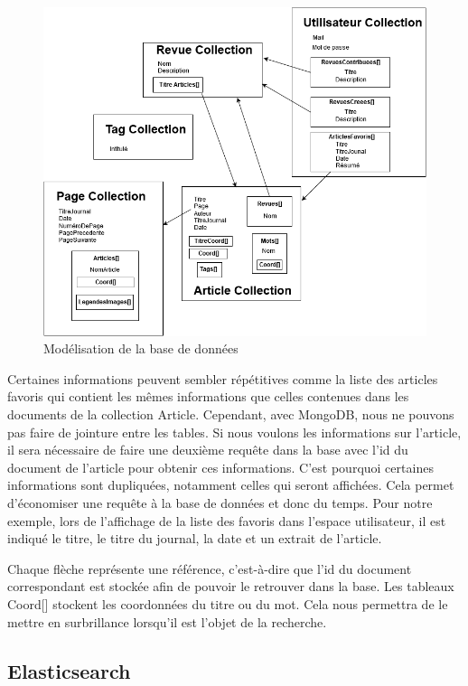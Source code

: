 \begin{figure}[H]
        \centering
        \includegraphics[width=\textwidth]{figure/ModelBDD.png}
            \caption{Modélisation de la base de données}
            \label{modelbdd}
\end{figure}

Certaines informations peuvent sembler répétitives comme la liste des articles favoris qui contient les mêmes informations que celles contenues dans les documents de la collection Article. Cependant, avec MongoDB, nous ne pouvons pas faire de jointure entre les tables. Si nous voulons les informations sur l’article, il sera nécessaire de faire une deuxième requête dans la base avec l’id du document de l’article pour obtenir ces informations. C’est pourquoi certaines informations sont dupliquées, notamment celles qui seront affichées. Cela permet d'économiser une requête à la base de données et donc du temps. Pour notre exemple, lors de l’affichage de la liste des favoris dans l’espace utilisateur, il est indiqué le titre, le titre du journal, la date et un extrait de l’article. 


Chaque flèche représente une référence, c’est-à-dire que l’id du document correspondant est stockée afin de pouvoir le retrouver dans la base. Les tableaux Coord[] stockent les coordonnées du  titre ou du mot. Cela nous permettra de le mettre en surbrillance lorsqu’il est l’objet de la recherche. 

\subsection{Elasticsearch}
\label{subsec:elastic}

